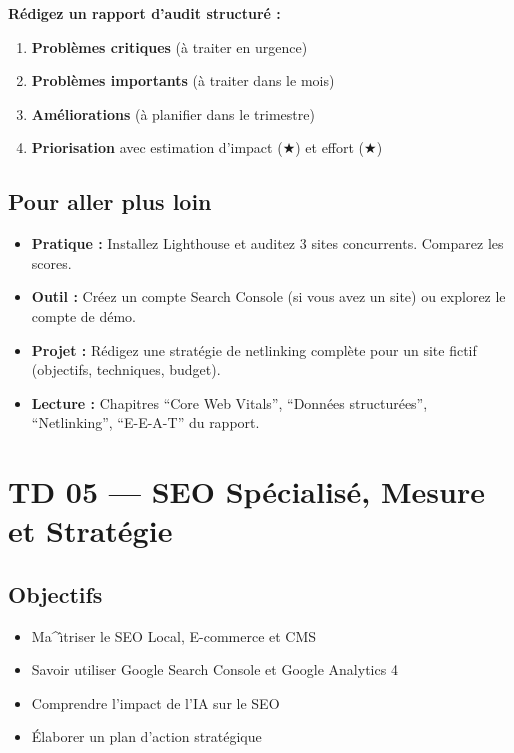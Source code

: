 \documentclass[12pt,a4paper]{report}
\begin{document}
\textbf{R\'{e}digez un rapport d'audit structur\'{e} :}
\begin{enumerate}
    \item \textbf{Probl\`{e}mes critiques} (\`{a} traiter en urgence)
    \item \textbf{Probl\`{e}mes importants} (\`{a} traiter dans le mois)
    \item \textbf{Am\'{e}liorations} (\`{a} planifier dans le trimestre)
    \item \textbf{Priorisation} avec estimation d'impact ($\bigstar$) et effort ($\bigstar$)
\end{enumerate}

\section{Pour aller plus loin}

\begin{itemize}
    \item \textbf{Pratique :} Installez Lighthouse et auditez 3 sites concurrents. Comparez les scores.
    \item \textbf{Outil :} Cr\'{e}ez un compte Search Console (si vous avez un site) ou explorez le compte de d\'{e}mo.
    \item \textbf{Projet :} R\'{e}digez une strat\'{e}gie de netlinking compl\`{e}te pour un site fictif (objectifs, techniques, budget).
    \item \textbf{Lecture :} Chapitres ``Core Web Vitals'', ``Donn\'{e}es structur\'{e}es'', ``Netlinking'', ``E-E-A-T'' du rapport.
\end{itemize}


\chapter{TD 05 --- SEO Sp\'{e}cialis\'{e}, Mesure et Strat\'{e}gie}

\section{Objectifs}
\begin{itemize}
    \item Ma^{\^\i}triser le SEO Local, E-commerce et CMS
    \item Savoir utiliser Google Search Console et Google Analytics 4
    \item Comprendre l'impact de l'IA sur le SEO
    \item \'{E}laborer un plan d'action strat\'{e}gique
\end{itemize}
\end{document}

